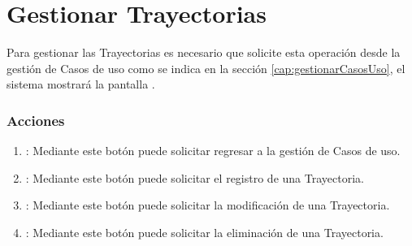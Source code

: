 
\section{Gestionar Trayectorias}

Para gestionar las Trayectorias es necesario que solicite esta operación desde la gestión de Casos de uso como se indica en la sección \ref{cap:gestionarCasosUso}, el sistema mostrará la pantalla .


\subsubsection{Acciones}

\begin{enumerate}
	\item {}: Mediante este botón puede solicitar regresar a la gestión de Casos de uso.
	\item {}: Mediante este botón puede solicitar el registro de una Trayectoria.
	\item {}: Mediante este botón puede solicitar la modificación de una Trayectoria.
	\item {}: Mediante este botón puede solicitar la eliminación de una Trayectoria.	
\end{enumerate}



